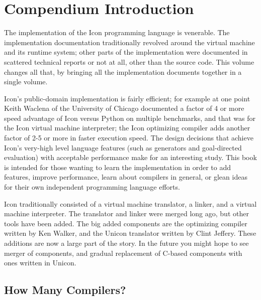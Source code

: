 \clearpage\setcounter{page}{1}\pagestyle{ClintStyleii}

\section*{Compendium Introduction}

The implementation of the Icon programming language is venerable.
The implementation documentation traditionally revolved around
the virtual machine and its runtime system; other parts of the
implementation were documented in scattered technical reports or not
at all, other than the source code. This volume changes all that, by
bringing all the implementation documents together in a single volume.

Icon's public-domain implementation is fairly efficient; for example
at one point Keith Waclena of the University of Chicago documented a
factor of 4 or more speed advantage of Icon versus Python on multiple
benchmarks, and that was for the Icon virtual machine interpreter; the
Icon optimizing compiler adds another factor of 2-5 or more in faster
execution speed. The design decisions that achieve Icon's very-high
level language features (such as generators and goal-directed
evaluation) with acceptable performance make for an interesting
study. This book is intended for those wanting to learn the
implementation in order to add features, improve performance, learn
about compilers in general, or glean ideas for their own independent
programming language efforts.

Icon traditionally consisted of a virtual machine translator, a
linker, and a virtual machine interpreter. The translator and linker
were merged long ago, but other tools have been added. The big added
components are the optimizing compiler written by Ken Walker, and the
Unicon translator written by Clint Jeffery. These additions are now a
large part of the story. In the future you might hope to see merger of
components, and gradual replacement of C-based components with ones
written in Unicon.


\subsection*{How Many Compilers?}

